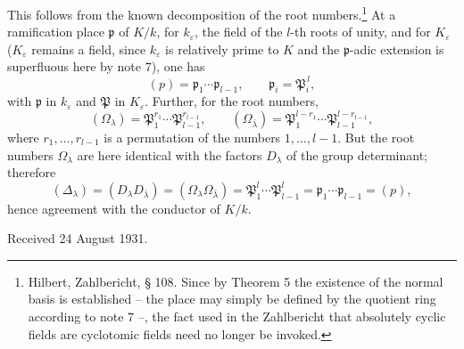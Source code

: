 \documentclass[11pt]{article}
\providecommand{\frakp}{\mathfrak p}
\begin{document}
This follows from the known decomposition of the root numbers.\footnote{Hilbert, Zahlbericht, § 108. Since by Theorem 5 the existence of the normal basis is established -- the place may simply be defined by the quotient ring according to note 7 --, the fact used in the Zahlbericht that absolutely cyclic fields are cyclotomic fields need no longer be invoked.} At a ramification place \(\frakp\) of \(K/k\), for \(k_\varepsilon\), the field of the \(l\)-th roots of unity, and for \(K_\varepsilon\) (\(K_\varepsilon\) remains a field, since \(k_\varepsilon\) is relatively prime to \(K\) and the \(\frakp\)-adic extension is superfluous here by note 7), one has
\[
        (p)=\frakp_1\cdots\frakp_{l-1},
        \qquad
        \frakp_i=\mathfrak P_i^{\,l},
\]
with \(\frakp\) in \(k_\varepsilon\) and \(\mathfrak P\) in \(K_\varepsilon\). Further, for the root numbers,
\[
        (\Omega_\lambda)=\mathfrak P_1^{r_1}\cdots\mathfrak P_{l-1}^{r_{l-1}},
        \qquad
        (\Omega_{\bar\lambda})=
        \mathfrak P_1^{l-r_1}\cdots\mathfrak P_{l-1}^{l-r_{l-1}},
\]
where \(r_1,
\ldots,r_{l-1}\) is a permutation of the numbers \(1,
\ldots,l-1\). But the root numbers \(\Omega_\lambda\) are here identical with the factors \(D_\lambda\) of the group determinant; therefore
\[
        (\Delta_\lambda)=(D_\lambda D_{\bar\lambda})
        =(\Omega_\lambda\Omega_{\bar\lambda})
        =\mathfrak P_1^{l}\cdots\mathfrak P_{l-1}^{l}
        =\frakp_1\cdots\frakp_{l-1}=(p),
\]
hence agreement with the conductor of \(K/k\).

\begin{center}
Received 24 August 1931.
\end{center}
\end{document}
